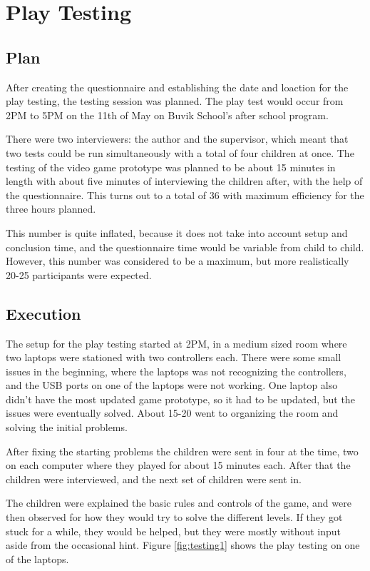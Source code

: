 \chapter{Play Testing}
\section{Plan}
After creating the questionnaire and establishing the date and loaction for the play testing, the testing session was planned. The play test would occur from 2PM to 5PM on the 11th of May on Buvik School's after school program. 

There were two interviewers: the author and the supervisor, which meant that two tests could be run simultaneously with a total of four children at once. The testing of the video game prototype was planned to be about 15 minutes in length with about five minutes of interviewing the children after, with the help of the questionnaire. This turns out to a total of 36 with maximum efficiency for the three hours planned. 

This number is quite inflated, because it does not take into account setup and conclusion time, and the questionnaire time would be variable from child to child. However, this number was considered to be a maximum, but more realistically 20-25 participants were expected.

\section{Execution}
The setup for the play testing started at 2PM, in a medium sized room where two laptops were stationed with two controllers each. There were some small issues in the beginning, where the laptops was not recognizing the controllers, and the USB ports on one of the laptops were not working. One laptop also didn't have the most updated game prototype, so it had to be updated, but the issues were eventually solved. About 15-20 went to organizing the room and solving the initial problems.

After fixing the starting problems the children were sent in four at the time, two on each computer where they played for about 15 minutes each. After that the children were interviewed, and the next set of children were sent in.

The children were explained the basic rules and controls of the game, and were then observed for how they would try to solve the different levels. If they got stuck for a while, they would be helped, but they were mostly without input aside from the occasional hint. Figure \ref{fig:testing1} shows the play testing on one of the laptops.

